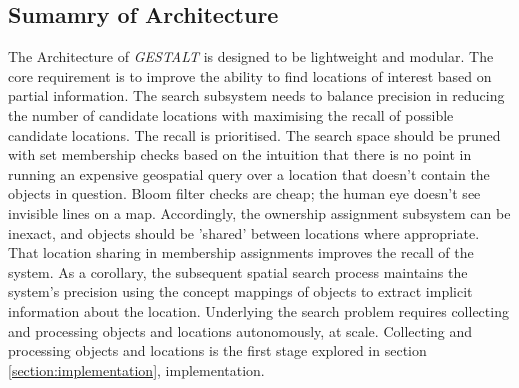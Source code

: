 \subsection{Sumamry of Architecture}
The Architecture of \textit{GESTALT} is designed to be lightweight and modular. The core requirement is to improve the ability to find locations of interest based on partial information. 
The search subsystem needs to balance precision in reducing the number of candidate locations with maximising the recall of possible candidate locations. The recall is prioritised. 
The search space should be pruned with set membership checks based on the intuition that there is no point in running an expensive geospatial query over a location that doesn't contain the objects in question. 
Bloom filter checks are cheap; the human eye doesn't see invisible lines on a map. Accordingly, the ownership assignment subsystem can be inexact, and objects should be 'shared' between locations where appropriate. 
That location sharing in membership assignments improves the recall of the system. As a corollary, the subsequent spatial search process maintains the system's precision using the concept mappings of objects to extract implicit information about the location. 
Underlying the search problem requires collecting and processing objects and locations autonomously, at scale. Collecting and processing objects and locations is the first stage explored in section \ref{section:implementation}, implementation. 
